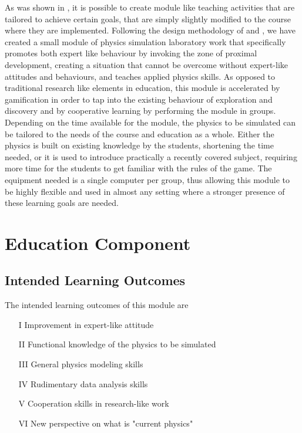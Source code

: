 \documentclass[11pt, twocolumn]{article}
\begin{document}
As was shown in \citet{redish2004teaching}, it is possible to create module like teaching activities that are tailored to achieve certain goals, that are simply slightly modified to the course where they are implemented. Following the design methodology of \citet{redish2004teaching} and \citet{heller1992teachingb}, we have created a small module of physics simulation laboratory work that specifically promotes both expert like behaviour by invoking the zone of proximal development, creating a situation that cannot be overcome without expert-like attitudes and behaviours, and teaches applied physics skills. As opposed to traditional research like elements in education, this module is accelerated by gamification in order to tap into the existing behaviour of exploration and discovery and by cooperative learning by performing the module in groups. Depending on the time available for the module, the physics to be simulated can be tailored to the needs of the course and education as a whole. Either the physics is built on existing knowledge by the students, shortening the time needed, or it is used to introduce practically a recently covered subject, requiring more time for the students to get familiar with the rules of the game. The equipment needed is a single computer per group, thus allowing this module to be highly flexible and used in almost any setting where a stronger presence of these learning goals are needed.

\section{Education Component}

\subsection{Intended Learning Outcomes}

The intended learning outcomes of this module are

\begin{itemize}
    \item[I] Improvement in expert-like attitude
    \item[II] Functional knowledge of the physics to be simulated
    \item[III] General physics modeling skills
    \item[IV] Rudimentary data analysis skills
    \item[V] Cooperation skills in research-like work
    \item[VI] New perspective on what is "current physics"
\end{itemize}
\end{document}

